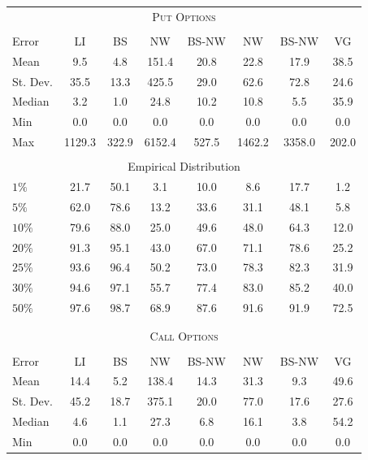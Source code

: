 \begin{center} 
 \begin{tabular*}{\textwidth}{@{\extracolsep{\fill}}lccccccc} 
 \toprule 
 \multicolumn{8}{c}{\textsc{Put Options}}\\ 
 \multicolumn{8}{c}{}\\ 
Error & LI & BS& NW & BS-NW & NW\raisebox{-.4ex}{\tiny CV} & BS-NW\raisebox{-.4ex}{\tiny CV} & VG \\  
 \midrule 
Mean       & 9.5& 4.8& 151.4& 20.8& 22.8& 17.9& 38.5\\ 
St. Dev.   & 35.5& 13.3& 425.5& 29.0& 62.6& 72.8& 24.6\\ 
Median     & 3.2& 1.0& 24.8& 10.2& 10.8& 5.5& 35.9\\ 
Min        & 0.0& 0.0& 0.0& 0.0& 0.0& 0.0& 0.0\\ 
Max        & 1129.3& 322.9& 6152.4& 527.5& 1462.2& 3358.0& 202.0\\ 
 \multicolumn{8}{c}{}\\ 
 \multicolumn{8}{c}{Empirical Distribution}\\ 
 \midrule 
$1\%$      & 21.7& 50.1& 3.1& 10.0& 8.6& 17.7& 1.2\\ 
$5\%$      & 62.0& 78.6& 13.2& 33.6& 31.1& 48.1& 5.8\\ 
$10\%$     & 79.6& 88.0& 25.0& 49.6& 48.0& 64.3& 12.0\\ 
$20\%$     & 91.3& 95.1& 43.0& 67.0& 71.1& 78.6& 25.2\\ 
$25\%$     & 93.6& 96.4& 50.2& 73.0& 78.3& 82.3& 31.9\\ 
$30\%$     & 94.6& 97.1& 55.7& 77.4& 83.0& 85.2& 40.0\\ 
$50\%$     & 97.6& 98.7& 68.9& 87.6& 91.6& 91.9& 72.5\\ 
 \multicolumn{8}{c}{}\\ 
 \multicolumn{8}{c}{}\\ 
 \toprule 
 \multicolumn{8}{c}{\textsc{Call Options}}\\ 
 \multicolumn{8}{c}{}\\ 
Error & LI & BS& NW & BS-NW & NW\raisebox{-.4ex}{\tiny CV} & BS-NW\raisebox{-.4ex}{\tiny CV} & VG \\  
 \midrule 
Mean       & 14.4& 5.2& 138.4& 14.3& 31.3& 9.3& 49.6\\ 
St. Dev.   & 45.2& 18.7& 375.1& 20.0& 77.0& 17.6& 27.6\\ 
Median     & 4.6& 1.1& 27.3& 6.8& 16.1& 3.8& 54.2\\ 
Min        & 0.0& 0.0& 0.0& 0.0& 0.0& 0.0& 0.0\\ 

\end{tabular*}
\end{center}
